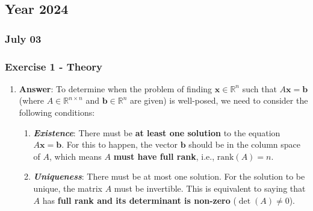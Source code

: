 \subsection{Year 2024}

\subsubsection{July 03}

\subsubsection*{Exercise 1 - Theory}

\begin{enumerate}[label=\textcolor{Green3}{\textbf{\arabic*.}}]
    \item {}

    \textbf{Answer}: To determine when the problem of finding $\mathbf{x} \in \mathbb{R}^{n}$ such that $A\mathbf{x} = \mathbf{b}$ (where $A \in \mathbb{R}^{n \times n}$ and $\mathbf{b} \in \mathbb{R}^n$ are given) is well-posed, we need to consider the following conditions:
    \begin{enumerate}
        \item \emph{\textbf{Existence}}: There must be \textbf{at least one solution} to the equation $A\mathbf{x} = \mathbf{b}$. For this to happen, the vector $\mathbf{b}$ should be in the column space of $A$, which means $A$ \textbf{must have full rank}, i.e., $\mathrm{rank}\left(A\right) = n$.
        
        \item \emph{\textbf{Uniqueness}}: There must be at most one solution. For the solution to be unique, the matrix $A$ must be invertible. This is equivalent to saying that $A$ has \textbf{full rank and its determinant is non-zero} ($\det(A) \neq 0$).
        

\end{enumerate}
\end{enumerate}
